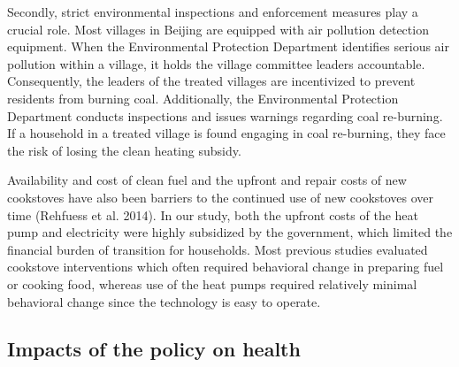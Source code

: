 \documentclass[
  letterpaper,
  DIV=11,
  numbers=noendperiod]{scrartcl}
\begin{document}
Secondly, strict environmental inspections and enforcement measures play
a crucial role. Most villages in Beijing are equipped with air pollution
detection equipment. When the Environmental Protection Department
identifies serious air pollution within a village, it holds the village
committee leaders accountable. Consequently, the leaders of the treated
villages are incentivized to prevent residents from burning coal.
Additionally, the Environmental Protection Department conducts
inspections and issues warnings regarding coal re-burning. If a
household in a treated village is found engaging in coal re-burning,
they face the risk of losing the clean heating subsidy.

Availability and cost of clean fuel and the upfront and repair costs of
new cookstoves have also been barriers to the continued use of new
cookstoves over time (Rehfuess et al. 2014). In our study, both the
upfront costs of the heat pump and electricity were highly subsidized by
the government, which limited the financial burden of transition for
households. Most previous studies evaluated cookstove interventions
which often required behavioral change in preparing fuel or cooking
food, whereas use of the heat pumps required relatively minimal
behavioral change since the technology is easy to operate.

\hypertarget{impacts-of-the-policy-on-health}{%
\subsection{Impacts of the policy on
health}\label{impacts-of-the-policy-on-health}}
\end{document}
